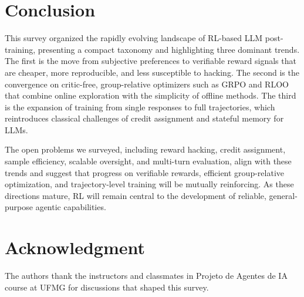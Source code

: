 \section{Conclusion}\label{sec:conclusion}

This survey organized the rapidly evolving landscape of RL-based LLM
post-training, presenting a compact taxonomy and highlighting three dominant
trends. The first is the move from subjective preferences to verifiable reward signals that are cheaper, more reproducible, and less susceptible
to hacking. The second is the convergence on critic-free, group-relative optimizers such as GRPO and RLOO that combine online exploration with the
simplicity of offline methods. The third is the expansion of training from single responses to full trajectories, which reintroduces classical
challenges of credit assignment and stateful memory for LLMs.

The open problems we surveyed, including reward hacking, credit
assignment, sample efficiency, scalable oversight, and multi-turn
evaluation, align with these trends and suggest that progress on
verifiable rewards, efficient group-relative optimization, and
trajectory-level training will be mutually reinforcing. As these
directions mature, RL will remain central to the development of reliable, general-purpose agentic capabilities.

\section*{Acknowledgment}

The authors thank the instructors and classmates in Projeto de Agentes de IA course at UFMG for discussions that shaped this survey.
